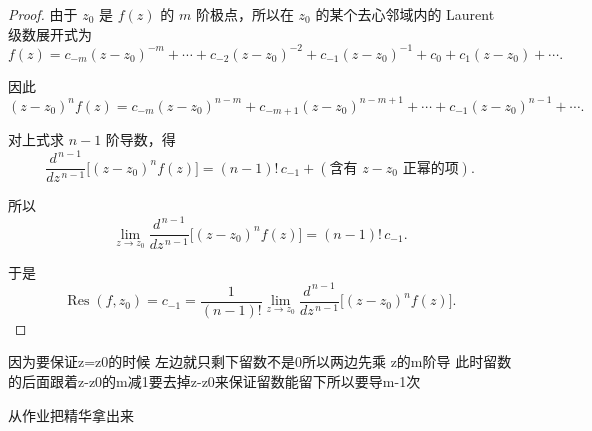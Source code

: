 \documentclass[lang=cn,10pt]{elegantbook}
\begin{document}
\begin{proof}
由于 $z_0$ 是 $f(z)$ 的 $m$ 阶极点，所以在 $z_0$ 的某个去心邻域内的 Laurent 级数展开式为
\[
f(z) = c_{-m}(z-z_0)^{-m} + \cdots + c_{-2}(z-z_0)^{-2} + c_{-1}(z-z_0)^{-1} + c_0 + c_1(z-z_0) + \cdots.
\]

因此
\[
(z-z_0)^n f(z) = c_{-m}(z-z_0)^{n-m} + c_{-m+1}(z-z_0)^{n-m+1} + \cdots + c_{-1}(z-z_0)^{n-1} + \cdots.
\]

对上式求 $n-1$ 阶导数，得
\[
\frac{d^{\,n-1}}{dz^{\,n-1}} \big[ (z-z_0)^n f(z) \big]
= (n-1)! \, c_{-1} + (\text{含有 } z-z_0 \text{ 正幂的项}).
\]

所以
\[
\lim_{z \to z_0} \frac{d^{\,n-1}}{dz^{\,n-1}} \big[ (z-z_0)^n f(z) \big] = (n-1)! \, c_{-1}.
\]

于是
\[
\operatorname{Res}(f,z_0) = c_{-1} 
= \frac{1}{(n-1)!} \lim_{z \to z_0} \frac{d^{\,n-1}}{dz^{\,n-1}} \big[ (z-z_0)^n f(z) \big].
\]
\end{proof}
\begin{dxtips}
    因为要保证z=z0的时候 左边就只剩下留数不是0所以两边先乘 z的m阶导 此时留数的后面跟着z-z0的m减1要去掉z-z0来保证留数能留下所以要导m-1次
\end{dxtips}


从作业把精华拿出来
\end{document}
